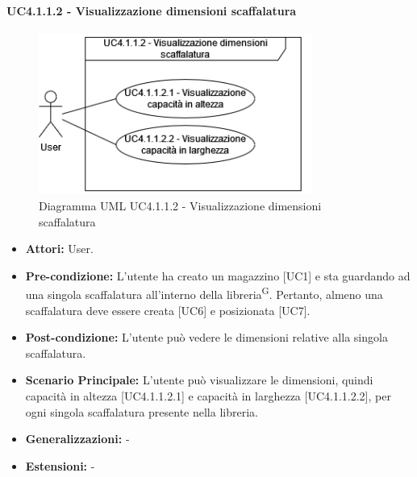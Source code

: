 \paragraph{UC4.1.1.2 - Visualizzazione dimensioni scaffalatura}
\begin{figure}[H]
  \centering
  \includegraphics[width=0.8\textwidth]{UC_diagrams_1-10/UC4.1.1.2.drawio.png}
   \caption{Diagramma UML UC4.1.1.2 - Visualizzazione dimensioni scaffalatura}
\end{figure}
\begin{itemize}
    \item \textbf{Attori:} User.
    \item \textbf{Pre-condizione:} L'utente ha creato un magazzino [UC1] e sta guardando ad una singola scaffalatura all'interno della libreria\textsuperscript{G}. Pertanto, almeno una scaffalatura deve essere creata [UC6] e posizionata [UC7].
    \item \textbf{Post-condizione:} L'utente può vedere le dimensioni relative alla singola scaffalatura.
    \item \textbf{Scenario Principale:} L'utente può visualizzare le dimensioni, quindi capacità in altezza [UC4.1.1.2.1] e capacità in larghezza [UC4.1.1.2.2], per ogni singola scaffalatura presente nella libreria.
    \item \textbf{Generalizzazioni:} -
    \item \textbf{Estensioni:} -
\end{itemize}


